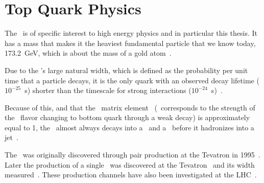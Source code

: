 

\section{Top Quark Physics}
\label{SECTION-TOP-PHYSICS}

The \at~is of specific interest to high energy physics and in particular this thesis. It has a mass that makes it the heaviest fundamental particle that we know today, 173.2~GeV, which is about the mass of a gold atom~\cite{topmass}.

 Due to the \at's large natural width, which is defined as the probability per unit time that a particle decays, it is the only quark with an observed decay lifetime ($10^{-25}$~s) shorter than the timescale for strong interactions ($10^{-24}$~s)~\cite{TOPWidth:1993,CDF-topwidth,D0-topwidth,D0TopWidth:2010}. 

\noindent Because of this, and that the \ckm~matrix element \vtb~(\vtb~corresponds to the strength of the \at~flavor changing to bottom quark through a weak decay) is approximately equal to 1, the \at~almost always decays into a \aw~and a \ab~before it hadronizes into a jet~\cite{sgtopvtb,QFT-PS}. 

The \at~was originally discovered through pair production at the Tevatron in 1995~\cite{Top-CDF,Top-D0}. Later the production of a single \at~was discovered at the Tevatron~\cite{SGTOP-D0,SGTOP-CDF} and its width measured~\cite{CDF-topwidth,D0-topwidth,D0TopWidth:2010}. These production channels have also been investigated at the LHC~\cite{Aad:2015yem,Aad:2014fwa,Aad:2012ux,Chatrchyan:2011vp,Schilling:2012dx}.

